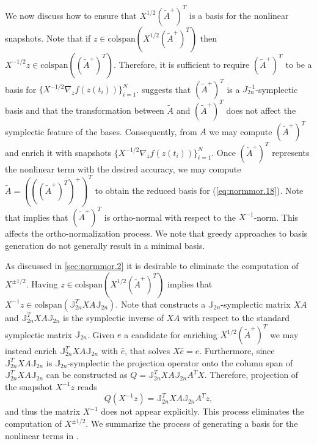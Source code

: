 We now discuss how to ensure that $X^{1/2} (\tilde A^+)^T$ is a basis for the nonlinear snapshots. Note that if $z \in \text{colspan}\left(X^{1/2} (\tilde A^+)^T\right)$ then $X^{-1/2} z \in \text{colspan}\left(( \tilde A^+)^T \right)$. Therefore, it is sufficient to require $(\tilde A^+)^T$ to be a basis for $\{X^{-1/2} \nabla_z f(z(t_i))\}_{i=1}^N$.  suggests that $(\tilde A^+)^T$ is a $J_{2n}^{-1}$-symplectic basis and that the transformation between $\tilde A$ and $(\tilde A^+)^T $ does not affect the symplectic feature of the bases. Consequently, from $A$ we may compute $(\tilde A^+)^T$ and enrich it with snapshots $\{X^{-1/2} \nabla_z f(z(t_i))\}_{i=1}^N$. Once $(\tilde A^+)^T$ represents the nonlinear term with the desired accuracy, we may compute $\tilde A= \left( \left( ( \tilde A^+ )^T \right)^+ \right)^T$ to obtain the reduced basis for (\ref{eq:normmor.18}). Note that  implies that $(\tilde A^+)^T$ is ortho-normal with respect to the $X^{-1}$-norm. This affects the ortho-normalization process. We note that greedy approaches to basis generation do not generally result in a minimal basis.

As discussed in \cref{sec:normmor.2} it is desirable to eliminate the computation of $X^{\pm 1/2}$. Having $z \in \text{colspan}\left(X^{1/2} (\tilde A^+)^T\right)$ implies that $X^{-1} z \in \text{colspan}(\mathbb J_{2n}^T X A \mathbb J_{2n})$. Note that  constructs a $\mathbb J_{2n}$-symplectic matrix $XA$ and $\mathbb J_{2n}^T X A \mathbb J_{2n}$ is the symplectic inverse of $XA$ with respect to the standard symplectic matrix $\mathbb J_{2n}$. Given $e$ a candidate for enriching $X^{1/2} (\tilde A^+)^T$ we may instead enrich $\mathbb J_{2n}^T X A \mathbb J_{2n}$ with $\hat e$, that solves $X \hat e = e$. Furthermore, since  $\mathbb J_{2n}^T X A \mathbb J_{2n}$ is $\mathbb J_{2n}$-symplectic the projection operator onto the column span of $\mathbb J_{2n}^T X A \mathbb J_{2n}$ can be constructed as $Q=\mathbb J_{2n}^T X A \mathbb J_{2n}A^TX$. Therefore, projection of the snapshot $X^{-1}z$ reads
\begin{equation}
	Q(X^{-1}z) = \mathbb J_{2n}^T X A \mathbb J_{2n}A^T z,
\end{equation}
and thus the matrix $X^{-1}$ does not appear explicitly. This process eliminates the computation of $X^{\pm 1/2}$. We summarize the process of generating a basis for the nonlinear terms in .

